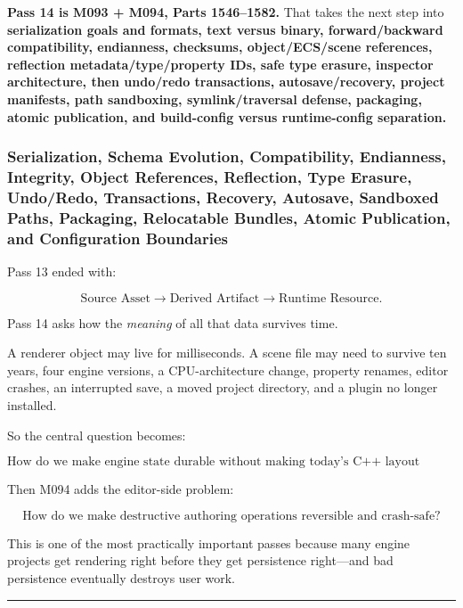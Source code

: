 \textbf{Pass 14 is M093 + M094, Parts 1546--1582.} That takes the next step into \textbf{serialization goals and formats, text versus binary, forward/backward compatibility, endianness, checksums, object/ECS/scene references, reflection metadata/type/property IDs, safe type erasure, inspector architecture, then undo/redo transactions, autosave/recovery, project manifests, path sandboxing, symlink/traversal defense, packaging, atomic publication, and build-config versus runtime-config separation.}

\subsubsection{Serialization, Schema Evolution, Compatibility, Endianness, Integrity, Object References, Reflection, Type Erasure, Undo/Redo, Transactions, Recovery, Autosave, Sandboxed Paths, Packaging, Relocatable Bundles, Atomic Publication, and Configuration Boundaries}\label{serialization-schema-evolution-compatibility-endianness-integrity-object-references-reflection-type-erasure-undoredo-transactions-recovery-autosave-sandboxed-paths-packaging-relocatable-bundles-atomic-publication-and-configuration-boundaries}

Pass 13 ended with:

\[
\text{Source Asset}
\rightarrow
\text{Derived Artifact}
\rightarrow
\text{Runtime Resource}.
\]

Pass 14 asks how the \emph{meaning} of all that data survives time.

A renderer object may live for milliseconds. A scene file may need to survive ten years, four engine versions, a CPU-architecture change, property renames, editor crashes, an interrupted save, a moved project directory, and a plugin no longer installed.

So the central question becomes:

\[
\boxed{
\text{How do we make engine state durable without making today's C++ layout tomorrow's file format?}
}
\]

Then M094 adds the editor-side problem:

\[
\boxed{
\text{How do we make destructive authoring operations reversible and crash-safe?}
}
\]

This is one of the most practically important passes because many engine projects get rendering right before they get persistence right---and bad persistence eventually destroys user work.

\begin{center}\rule{0.5\linewidth}{0.5pt}\end{center}

